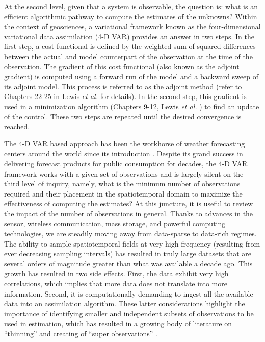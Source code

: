 \documentclass{article}
\begin{document}
At the second level, given that a system is observable, the question is: what is an efficient algorithmic pathway to compute the estimates of the unknowns? Within the context of geosciences, a variational framework known as the four-dimensional variational data assimilation (4-D VAR) provides an answer in two steps. In the first step, a cost functional is defined by the weighted sum of squared differences between the actual and model counterpart of the observation at the time of the observation. The gradient of this cost functional (also known as the adjoint gradient) is computed using a forward run of the model and a backward sweep of its adjoint model. This process is referred to as the adjoint method (refer to Chapters 22-25 in Lewis \emph{et al.} \cite{lewis2006dynamic} for details). In the second step, this gradient is used in a minimization algorithm (Chapters 9-12, Lewis \emph{et al.} \cite{lewis2006dynamic}) to find an update of the control. These two steps are repeated until the desired convergence is reached. 

The 4-D VAR based approach has been the workhorse of weather forecasting centers around the world since its introduction \cite{le1986variational}. Despite its grand success in delivering forecast products for public consumption for decades, the 4-D VAR framework works with a given set of observations and is largely silent on the third level of inquiry, namely, what is the minimum number of observations required and their placement in the spatiotemporal domain to maximize the effectiveness of computing the estimates? At this juncture, it is useful to review the impact of the number of observations in general. Thanks to advances in the sensor, wireless communication, mass storage, and powerful computing technologies, we are steadily moving away from data-sparse to data-rich regimes. The ability to sample spatiotemporal fields at very high frequency (resulting from ever decreasing sampling intervals) has resulted in truly large datasets that are several orders of magnitude greater than what was available a decade ago. This growth has resulted in two side effects. First, the data exhibit very high correlations, which implies that more data does not translate into more information. Second, it is computationally demanding to ingest all the available data into an assimilation algorithm. These latter considerations highlight the importance of identifying smaller and independent subsets of observations to be used in estimation, which has resulted in a growing body of literature on ``thinning'' and creating of ``super observations'' \cite{ochotta2005adaptive}.
\end{document}
